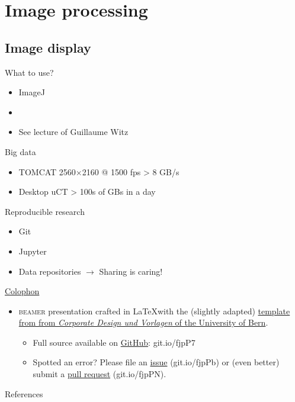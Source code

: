 \documentclass[aspectratio=169,10pt]{beamer}
\begin{document}
\section{Image processing}
\subsection{Image display}

\begin{frame}{What to use?}
	\begin{itemize}
		\item ImageJ
		\item \faPython
		\item See lecture of Guillaume Witz
	\end{itemize}
\end{frame}

\begin{frame}{Big data}
	\begin{itemize}
		\item TOMCAT 2560\(\times\)2160 @ 1500 fps \textgreater{} 8 GB/s
		\item Desktop uCT \textgreater{} 100s of GBs in a day
	\end{itemize}
\end{frame}

\begin{frame}{Reproducible research}
	\begin{itemize}
		\item Git
		\item Jupyter
		\item Data repositories \(\rightarrow\) Sharing is caring!
	\end{itemize}
\end{frame}

\begin{frame}{\href{https://en.wikipedia.org/wiki/Colophon_(publishing)}{Colophon}}
	\begin{itemize} 
		\item \textsc{beamer} presentation crafted in \LaTeX with the (slightly adapted) \href{http://intern.unibe.ch/dienstleistungen/corporate_design_und_vorlagen/praesentationen/index_ger.html}{template from from \emph{Corporate Design und Vorlagen} of the University of Bern}.
		\begin{itemize}
			\item Full source available on \href{https://github.com/habi/lecture_microtomography/}{GitHub}: git.io/fjpP7
			\item Spotted an error? Please file an \href{https://github.com/habi/lecture_microtomography/issues}{issue} (git.io/fjpPb) or (even better) submit a \href{https://github.com/habi/lecture_microtomography/pulls}{pull request} (git.io/fjpPN).
		\end{itemize}
	\end{itemize}
\end{frame}

\begin{frame}{References}
	\renewcommand*{\bibfont}{\scriptsize}
	\printbibliography
\end{frame}
\end{document}
